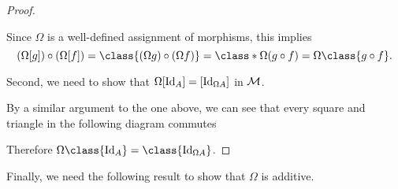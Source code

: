 \begin{proof}
\begin{center}
    \end{center}
    Since \( \Omega \) is a well-defined assignment of morphisms, this implies
    \[
        (\Omega [g]) \circ (\Omega [f]) = \class{(\Omega g) \circ (\Omega f)} = \class*{\Omega (g \circ f)} = \Omega \class{g \circ f}.
    \]

    Second, we need to show that \( \Omega [\operatorname{Id}_A] = [\operatorname{Id}_{\Omega A}] \) in \( {\mathcal{M}} \).

    By a similar argument to the one above, we can see that every square and triangle in the following diagram commutes
    \begin{center}
    \end{center}
    Therefore \( \Omega \class{\Id_A} = \class{\Id_{\Omega A}} \).
\end{proof}

Finally, we need the following result to show that \( \Omega \) is additive.

